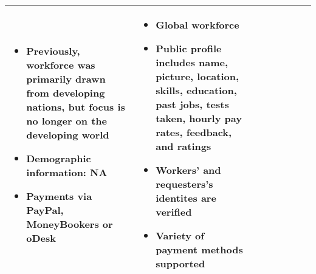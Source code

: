 \documentclass{sigchi}
\begin{document}
\begin{sidewaystable*}
\begin{tabular}[h]{| p{1.5cm}| p{2.7cm}| p{2.7cm}| p{2.7cm}| p{2.7cm}| p{2.7cm}| p{2.7cm}| p{2.7cm}|}
{\begin{itemize} [noitemsep,nolistsep]
\item  Previously, workforce was primarily drawn from developing nations, but focus is no longer on the developing world
\item  Demographic information: NA
\item  Payments via PayPal, MoneyBookers or oDesk
\end{itemize}
} &
{
\begin{itemize} [noitemsep,nolistsep]
\item  Global workforce
\item  Public profile includes name, picture, location, skills, education, past jobs, tests taken, hourly pay rates, feedback, and ratings
\item  Workers' and requesters's identites are verified
\item  Variety of payment methods supported
\end{itemize}
} \\ 
\hline

 


\end{tabular}
\end{sidewaystable*}
\end{document}
